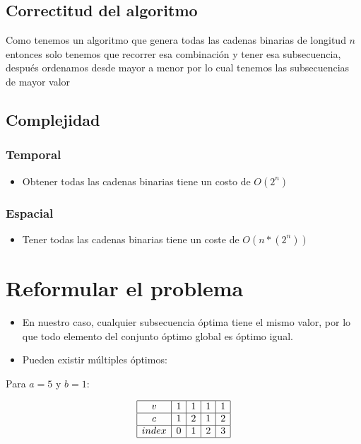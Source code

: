\documentclass{article}
\begin{document}
\subsection{Correctitud del algoritmo}
Como tenemos un algoritmo que genera todas las cadenas binarias de longitud $n$ entonces solo tenemos que recorrer esa combinación
y tener esa subsecuencia, después ordenamos desde mayor a menor por lo cual tenemos las subsecuencias de mayor valor
\subsection{Complejidad}
\subsubsection{Temporal}
\begin{itemize}
    \item Obtener todas las cadenas binarias tiene un costo de $O(2^n)$
\end{itemize}
\subsubsection{Espacial}
\begin{itemize}
    \item Tener todas las cadenas binarias tiene un coste de $O(n*(2^n))$ 
\end{itemize}

\pagebreak %

\section*{Reformular el problema}

\begin{itemize}
    \item En nuestro caso, cualquier subsecuencia óptima tiene el mismo valor, por lo que todo elemento del conjunto óptimo global es óptimo igual.
    \item Pueden existir múltiples óptimos:
\end{itemize}

Para $a=5$ y $b=1$:

\[
\begin{array}{|c|c|c|c|c|}
\hline
v & 1 & 1 & 1 & 1 \\
\hline
c & 1 & 2 & 1 & 2 \\
\hline
index & 0 & 1 & 2 & 3 \\
\hline
\end{array}
\]
\end{document}
